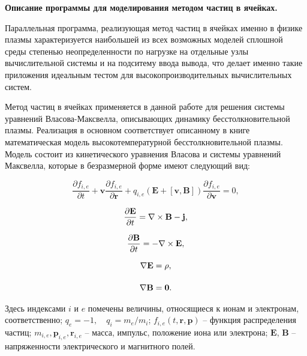 \textbf{Описание программы для моделирования методом частиц в ячейках.}

Параллельная программа, реализующая  метод частиц в ячейках именно в физике плазмы характеризуется наибольшей из всех возможных моделей сплошной среды степенью неопределенности по нагрузке на отдельные узлы вычислительной системы и на подситему ввода вывода, что делает именно такие приложения идеальным тестом для высокопроизводительных вычислительных систем. 

Метод частиц в ячейках применяется в данной работе для решения системы уравнений Власова-Максвелла, описывающих динамику бесстолкновительной плазмы.
Реализация в основном соответствует описанному в книге \cite{VshivkovPICbook}
математическая модель высокотемпературной бесстолкновительной плазмы.
Модель состоит из кинетического уравнения Власова и системы
уравнений Максвелла, которые в безразмерной форме имеют
следующий вид:

\begin{equation}\label{eq:Vlas}
\frac{\partial f_{i,e}}{\partial t}+{\textbf{v}} \frac{\partial f_{i,e}}{\partial \textbf{r}}+q_{i,e}({\textbf{E}}+[{\textbf{v}},{\textbf{B}}])\frac{\partial f_{i,e}}{\partial \textbf{v}}=0, 
\end{equation}

\begin{equation}
\begin{array}{c}\displaystyle

\frac{\partial \textbf{E}}{\partial t}=\nabla\times \textbf{B} - \bf{j},  \label{eq:dE}
\\[5mm]\displaystyle
\frac{\partial \textbf{B}}{\partial t}=-\nabla\times \textbf{E},  \label{eq:dB}
\\[5mm]\displaystyle
\nabla \bf{E} = \rho, \label{eq:divE}
\\[5mm]\displaystyle
\nabla \bf{B} = 0.  \label{eq:divB}

\end{array}
\end{equation}

Здесь индексами $i$ и $e$ помечены величины, относящиеся к ионам и
электронам, со\-от\-ветст\-вен\-но; $q_e=-1, \quad q_i=m_e/m_i$; $f_{i,e}(t,\textbf{r},\textbf{p})$ --
функция распределения частиц; $m_{i,e}, \textbf{p}_{i,e},
\textbf{r}_{i,e}$ -- масса, импульс, положение иона или электрона;
$\textbf{E}$, $\textbf{B}$ -- напряженности электрического и магнитного
полей. 

